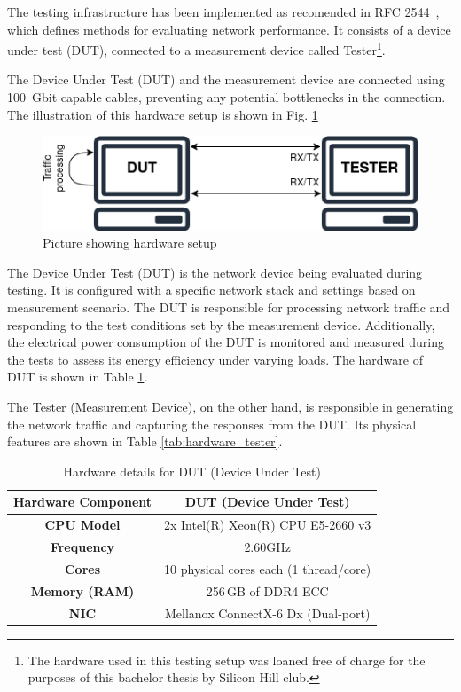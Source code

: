 The testing infrastructure has been implemented as recomended in RFC 2544~\cite{rfc2544}, which defines methods for evaluating network performance. 
It consists of a device under test (DUT), connected to a measurement device called Tester\footnote{The hardware used in this testing setup was loaned free of charge for the purposes of this bachelor thesis by Silicon Hill club.}.

The Device Under Test (DUT) and the measurement device are connected using 100~Gbit capable cables, preventing any potential bottlenecks in the connection.
The illustration of this hardware setup is shown in Fig. \ref{fig:hardware-setup}

\begin{figure}[!htbp]
    \centering
    \includegraphics[width=0.9\linewidth]{images/setup.png}
    \caption{Picture showing hardware setup}
    \label{fig:hardware-setup}
\end{figure}

The Device Under Test (DUT) is the network device being evaluated during testing. 
It is configured with a specific network stack and settings based on measurement scenario.
The DUT is responsible for processing network traffic and responding to the test conditions set by the measurement device.
Additionally, the electrical power consumption of the DUT is monitored and measured during the tests to assess its energy efficiency under varying loads.
The hardware of DUT is shown in Table \ref{tab:hardware_dut}.

The Tester (Measurement Device), on the other hand, is responsible in generating the network traffic and capturing the responses from the DUT.
Its physical features are shown in Table \ref{tab:hardware_tester}. 

\begin{table}[h!]
\centering
\caption{Hardware details for DUT (Device Under Test)}
\begin{tabular}{|c|c|}
\hline
\textbf{Hardware Component} & \textbf{DUT (Device Under Test)} \\
\hline
\textbf{CPU Model} & 2x Intel(R) Xeon(R) CPU E5-2660 v3 \\
\hline
\textbf{Frequency} & 2.60GHz \\
\hline
\textbf{Cores} & 10 physical cores each (1 thread/core) \\
\hline
\textbf{Memory (RAM)} & 256 GB of DDR4 ECC \\
\hline
\textbf{NIC} & Mellanox ConnectX-6 Dx (Dual-port) \\
\hline
\end{tabular}
\label{tab:hardware_dut}
\end{table}


